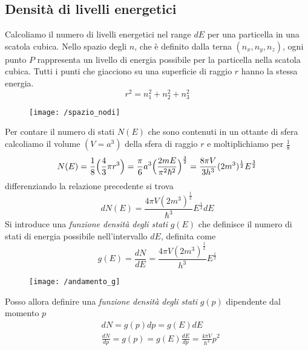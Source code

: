 \subsection{Densità di livelli energetici} 
Calcoliamo il numero di livelli energetici nel range $dE$ per una particella in una scatola cubica.
Nello spazio degli $n$, che è definito dalla terna $(n_x, n_y, n_z)$, ogni punto $P$ rappresenta un livello di energia possibile per la particella nella scatola cubica.
Tutti i punti che giacciono su una superficie di raggio $r$ hanno la stessa energia.
\begin{equation}
r^2 =  n_1^2 + n_2^2 + n_3^2
\end{equation}
\begin{figure}[h]
\centering
\texttt{[image: /spazio\_nodi]}
\end{figure}
Per contare il numero di stati $N(E)$ che sono contenuti in un ottante di sfera calcoliamo il volume $(V=a^3)$ della sfera di raggio $r$ e moltiplichiamo per $\frac{1}{8}$
\begin{equation}
N(E) = \frac{1}{8} \Bigl( \frac{4}{3} \pi r^3 \Bigr) = \frac{\pi}{6} a^3 \Bigl( \frac{2 m E}{\pi^2 \hbar^2} \Bigr) ^{\frac{3}{2}} = 
\frac{8 \pi V}{3 h^3} (2 m^3) ^{\frac{1}{2}} E^{\frac{3}{2}}
\end{equation}
differenziando la relazione precedente si trova
\begin{equation}
dN(E) = \frac{4 \pi V (2 m^3)^{\frac{1}{2}} }{\hbar^3}  E^{\frac{1}{2}} dE
\end{equation}
Si introduce una \textit{funzione densità degli stati} $g(E)$ che definisce il numero di stati di energia possibile nell'intervallo $dE$, definita come
\begin{equation}
g(E) = \frac{ dN}{dE } = \frac{ 4\pi V (2m^3)^{\frac{ 1}{2 }}}{h^3 } E^{ \frac{ 1}{2 } }
\end{equation}
\begin{figure}[h]
\centering
\texttt{[image: /andamento\_g]}
\end{figure}
Posso allora definire una \textit{funzione densità degli stati} $g(p)$ dipendente dal momento $p$
\begin{equation}
\begin{split}
& dN = g(p)dp = g(E)dE \\
& \frac{ dN}{dp } = g(p) = g(E) \frac{ dE}{dp } = \frac{ 4\pi V}{h^3 } p^2
\end{split}
\end{equation}

